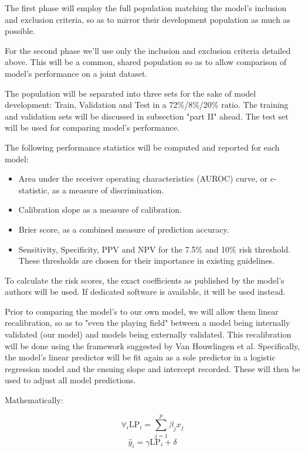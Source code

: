 \documentclass[a4paper,12pt]{article}
\begin{document}
		The first phase will employ the full population matching the model's inclusion and exclusion criteria, so as to mirror their development population as much as possible.
		
		For the second phase we'll use only the inclusion and exclusion criteria detailed above. This will be a common, shared population so as to allow comparison of model's performance on a joint dataset.
		
		The population will be separated into three sets for the sake of model development: Train, Validation and Test in a 72\%/8\%/20\% ratio. The training and validation sets will be discussed in subsection "part II" ahead. The test set will be used for comparing model's performance.
		
		The following performance statistics will be computed and reported for each model\cite{Steyerberg2008,FrankE.Harrell2015}:
		
		\begin{itemize}
			\item Area under the receiver operating characteristics (AUROC) curve, or c-statistic, as a measure of discrimination.
			\item Calibration slope as a measure of calibration.
			\item Brier score, as a combined measure of prediction accuracy.
			\item Sensitivity, Specificity, PPV and NPV for the 7.5\% and 10\% risk threshold. These thresholds are chosen for their importance in existing guidelines\cite{Goff2014,Bibbins-Domingo2016}.
		\end{itemize}
		
		To calculate the risk scores, the exact coefficients as published by the model's authors will be used. If dedicated software is available, it will be used instead.
		
		Prior to comparing the model's to our own model, we will allow them linear recalibration, so as to "even the playing field" between a model being internally validated (our model) and models being externally validated. This recalibration will be done using the framework suggested by Van Houwlingen et al\cite{Houwelingen2000}. Specifically, the model's linear predictor will be fit again as a sole predictor in a logistic regression model and the ensuing slope and intercept recorded. These will then be used to adjust all model predictions.
		
		Mathematically:
		
		\begin{equation*}
		\forall_i \text{LP}_i = \sum_{j=1}^{p}\beta_jx_j
		\end{equation*}
		\begin{equation*}
		\hat{y}_i = \gamma \text{LP}_i + \delta
		\end{equation*}
		
\end{document}
